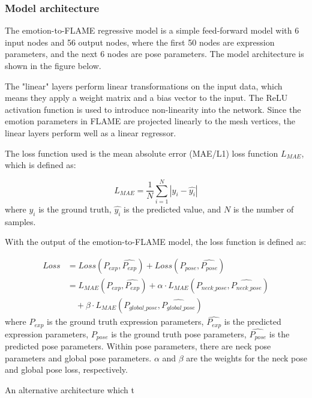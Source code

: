 \subsubsection{Model architecture}

The emotion-to-FLAME regressive model is a simple feed-forward model with 6 input nodes and 56 output nodes, where the first 50 nodes are expression parameters, and the next 6 nodes are pose parameters. The model architecture is shown in the figure below.


The "linear" layers perform linear transformations on the input data, which means they apply a weight matrix and a bias vector to the input. The ReLU activation function is used to introduce non-linearity into the network. Since the emotion parameters in FLAME are projected linearly to the mesh vertices, the linear layers perform well as a linear regressor.

The loss function used is the mean absolute error (MAE/L1) loss function $L_{MAE}$, which is defined as:

\begin{equation}
    L_{MAE} = \frac{1}{N}\sum_{i=1}^{N}|y_i-\hat{y_i}|
\end{equation}
where $y_i$ is the ground truth, $\hat{y_i}$ is the predicted value, and $N$ is the number of samples.

With the output of the emotion-to-FLAME model, the loss function is defined as:

\begin{equation}
    \begin{split}
        Loss & = Loss(P_{exp},\hat{P_{exp}}) + Loss(P_{pose},\hat{P_{pose}})                               \\
             & = L_{MAE}(P_{exp},\hat{P_{exp}}) + \alpha\cdot L_{MAE}(P_{neck\_pose},\hat{P_{neck\_pose}}) \\
             & \quad + \beta\cdot L_{MAE}(P_{global\_pose},\hat{P_{global\_pose}})
    \end{split}
\end{equation}
where $P_{exp}$ is the ground truth expression parameters, $\hat{P_{exp}}$ is the predicted expression parameters, $P_{pose}$ is the ground truth pose parameters, $\hat{P_{pose}}$ is the predicted pose parameters. Within pose parameters, there are neck pose parameters and global pose parameters. $\alpha$ and $\beta$ are the weights for the neck pose and global pose loss, respectively.

An alternative architecture which t